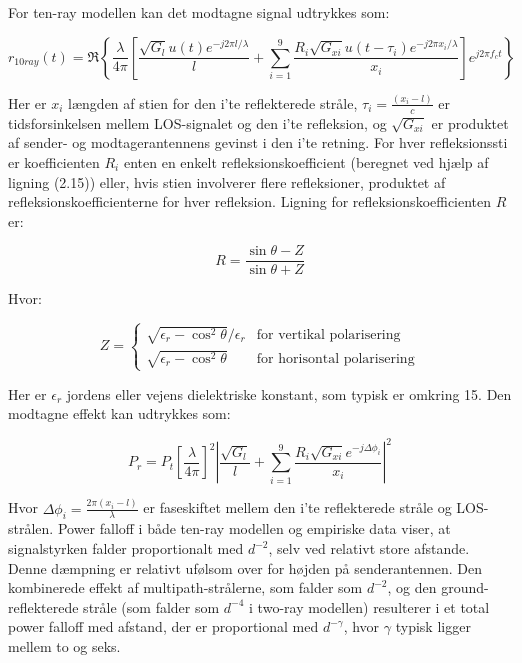 \documentclass[a4paper,12pt]{book}
\begin{document}
	\noindent For ten-ray modellen kan det modtagne signal udtrykkes som:
	
	\[
	r_{10ray}(t) = \Re \left\{ \frac{\lambda}{4\pi} \left[ \frac{\sqrt{G_l} u(t) e^{-j2\pi l/\lambda}}{l} + \sum_{i=1}^{9} \frac{R_i \sqrt{G_{xi}} u(t - \tau_i) e^{-j2\pi x_i/\lambda}}{x_i} \right] e^{j2\pi f_c t} \right\}
	\]
	
	\noindent Her er \( x_i \) længden af stien for den i'te reflekterede stråle, \( \tau_i = \frac{(x_i - l)}{c} \) er tidsforsinkelsen mellem LOS-signalet og den i'te refleksion, og \( \sqrt{G_{xi}} \) er produktet af sender- og modtagerantennens gevinst i den i'te retning. For hver refleksionssti er koefficienten \( R_i \) enten en enkelt refleksionskoefficient (beregnet ved hjælp af ligning (2.15)) eller, hvis stien involverer flere refleksioner, produktet af refleksionskoefficienterne for hver refleksion. 
	\newline\newline
	\noindent Ligning for refleksionskoefficienten \( R \) er:
	
	\[
	R = \frac{\sin \theta - Z}{\sin \theta + Z}
	\]
	
	\noindent Hvor:
	
	\[
	Z = \begin{cases} 
		\sqrt{\epsilon_r - \cos^2\theta}/\epsilon_r & \text{for vertikal polarisering} \\
		\sqrt{\epsilon_r - \cos^2\theta} & \text{for horisontal polarisering}
	\end{cases}
	\]
	
	\noindent Her er \(\epsilon_r\) jordens eller vejens dielektriske konstant, som typisk er omkring 15.
	\newline\newline
	\noindent Den modtagne effekt kan udtrykkes som:
	
	\[
	P_r = P_t \left[ \frac{\lambda}{4\pi} \right]^2 \left| \frac{\sqrt{G_l}}{l} + \sum_{i=1}^{9} \frac{R_i \sqrt{G_{xi}} e^{-j\Delta \phi_i}}{x_i} \right|^2
	\]
	
	\noindent Hvor \( \Delta \phi_i = \frac{2\pi(x_i - l)}{\lambda} \) er faseskiftet mellem den i'te reflekterede stråle og LOS-strålen. 
	\newline\newline
	\noindent Power falloff i både ten-ray modellen og empiriske data viser, at signalstyrken falder proportionalt med \( d^{-2} \), selv ved relativt store afstande. Denne dæmpning er relativt ufølsom over for højden på senderantennen. Den kombinerede effekt af multipath-strålerne, som falder som \( d^{-2} \), og den ground-reflekterede stråle (som falder som \( d^{-4} \) i two-ray modellen) resulterer i et total power falloff med afstand, der er proportional med \( d^{-\gamma} \), hvor \( \gamma \) typisk ligger mellem to og seks.
	
\end{document}
